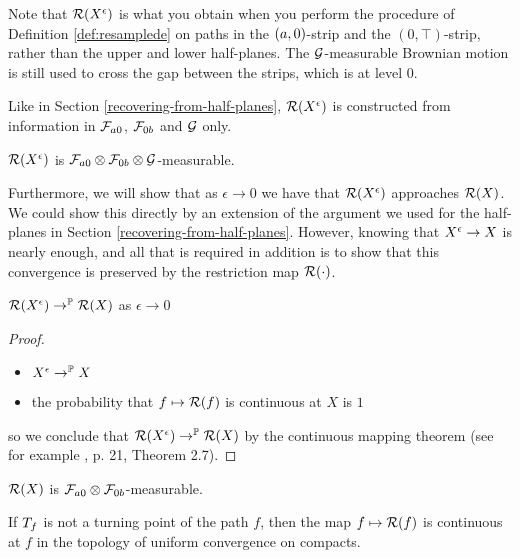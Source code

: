 {Note that $\mathcal{R}(X^{\epsilon})$ is what you obtain when you perform the
procedure of Definition \ref{def:resamplede} on paths in the
$(a,0)$-strip and the $(0,\top)$-strip, rather than the upper and lower
half-planes.  The $\mathcal{G}$-measurable Brownian motion is still used to
cross the gap between the strips, which is at level $0$.

Like in Section \ref{recovering-from-half-planes}, $\mathcal{R}(X^{\epsilon})$
is constructed from information in $\mathcal{F}_{a 0}$,
$\mathcal{F}_{0 b}$ and $\mathcal{G}$ only.

\begin{observation}
  $\mathcal{R}(X^{\epsilon})$ is $\mathcal{F}_{a 0} \otimes \mathcal{F}_{0 b}
  \otimes \mathcal{G}$-measurable.
\end{observation}

Furthermore, we will show that as $\epsilon \to 0$ we have that
$\mathcal{R}(X^{\epsilon})$ approaches $\mathcal{R}(X)$.  We could show this
directly by an extension of the argument we used for the half-planes
in Section \ref{recovering-from-half-planes}.  However, knowing that
$X^{\epsilon} \to X$ is nearly enough, and all that is required
in addition is to show that this convergence is preserved by the
restriction map $\mathcal{R}(\cdot)$.

\begin{lemma}
  $\mathcal{R}(X^{\epsilon}) \to^{\mathbb{P}} \mathcal{R}(X)$ as $\epsilon \to 0$
\end{lemma}

\begin{proof}
  \begin{itemize}
  \item $X^{\epsilon} \to^{\mathbb{P}} X$
  \item the probability that $f \mapsto \mathcal{R}(f)$ is continuous
    at $X$ is $1$
  \end{itemize}
  so we conclude that $\mathcal{R}(X^{\epsilon}) \to^{\mathbb{P}}
  \mathcal{R}(X)$ by the continuous mapping theorem (see for
  example \cite{billingsley}, p. 21, Theorem 2.7).
\end{proof}

\begin{lemma}
  $\mathcal{R}(X)$ is $\mathcal{F}_{a 0} \otimes
  \mathcal{F}_{0 b}$-measurable.
\end{lemma}

\begin{lemma}
  If $T_{f}$ is not a turning point of the path $f$,
  then the map $f \mapsto \mathcal{R}(f)$ is continuous at $f$ in the
  topology of uniform convergence on compacts.
\end{lemma}

}
